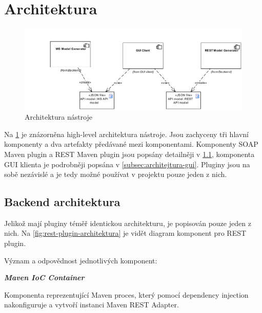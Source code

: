 \documentclass[11pt,twoside,a4paper]{book}
\begin{document}
\section{Architektura}

\begin{figure}[h]
\begin{center}
\includegraphics[width=14cm,left]{images-pdf/Architecture.pdf}
\caption{Architektura nástroje}
\label{fig:architektura}
\end{center}
\end{figure}

Na \ref{fig:architektura} je znázorněna high-level architektura nástroje. Jsou
zachyceny tři hlavní komponenty a dva artefakty předávané mezi komponentami.
Komponenty SOAP Maven plugin a REST Maven plugin jsou popsány detailněji v
\ref{subsec:backend-architektura}, komponenta GUI klienta je podrobněji popsána
v \ref{subsec:architejtura-gui}. Pluginy jsou na sobě nezávislé a je tedy možné
používat v projektu pouze jeden z nich.

\subsection{Backend architektura}
\label{subsec:backend-architektura}

Jelikož mají pluginy téměř identickou architekturu, je popisován pouze jeden z
nich. Na \ref{fig:rest-plugin-architektura} je vidět diagram komponent pro REST
plugin.

Význam a odpovědnost jednotlivých komponent:

\textbf{\textit{Maven IoC Container}}

Komponenta reprezentující Maven proces, který pomocí dependency
injection \cite{IoCFowler} nakonfiguruje a vytvoří instanci Maven REST Adapter.
\end{document}
